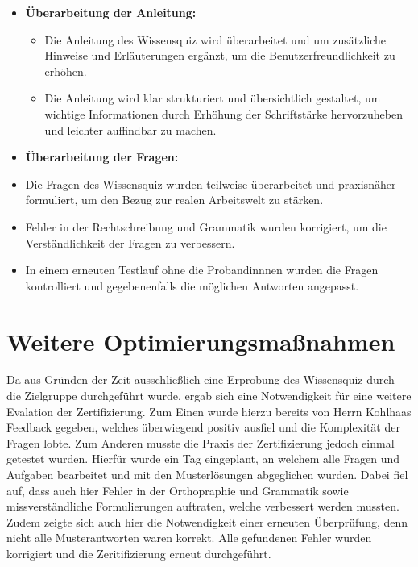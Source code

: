 \begin{itemize}
    \item \textbf{Überarbeitung der Anleitung:}
    \begin{itemize}
        \item Die Anleitung des Wissensquiz wird überarbeitet und um zusätzliche Hinweise und Erläuterungen ergänzt, um die Benutzerfreundlichkeit zu erhöhen.
        \item Die Anleitung wird klar strukturiert und übersichtlich gestaltet, um wichtige Informationen durch Erhöhung der Schriftstärke hervorzuheben und leichter auffindbar zu machen.
    \end{itemize}
    \item \textbf{Überarbeitung der Fragen:}
        \item Die Fragen des Wissensquiz wurden teilweise überarbeitet und praxisnäher formuliert, um den Bezug zur realen Arbeitswelt zu stärken.
        \item Fehler in der Rechtschreibung und Grammatik wurden korrigiert, um die Verständlichkeit der Fragen zu verbessern.
        \item In einem erneuten Testlauf ohne die Probandinnnen wurden die Fragen kontrolliert und gegebenenfalls die möglichen Antworten angepasst.
\end{itemize}

\section{Weitere Optimierungsmaßnahmen}
Da aus Gründen der Zeit ausschließlich eine Erprobung des Wissensquiz durch die Zielgruppe durchgeführt wurde,
ergab sich eine Notwendigkeit für eine weitere Evalation der Zertifizierung.
Zum Einen wurde hierzu bereits von Herrn Kohlhaas Feedback gegeben, welches überwiegend positiv ausfiel und
die Komplexität der Fragen lobte. Zum Anderen musste die Praxis der Zertifizierung jedoch einmal getestet wurden.
Hierfür wurde ein Tag eingeplant, an welchem alle Fragen und Aufgaben bearbeitet und mit den Musterlösungen abgeglichen wurden.
Dabei fiel auf, dass auch hier Fehler in der Orthopraphie und Grammatik sowie missverständliche Formulierungen auftraten, welche verbessert werden mussten.
Zudem zeigte sich auch hier die Notwendigkeit einer erneuten Überprüfung, denn nicht alle Musterantworten waren korrekt. 
Alle gefundenen Fehler wurden korrigiert und die Zeritifizierung erneut durchgeführt.


